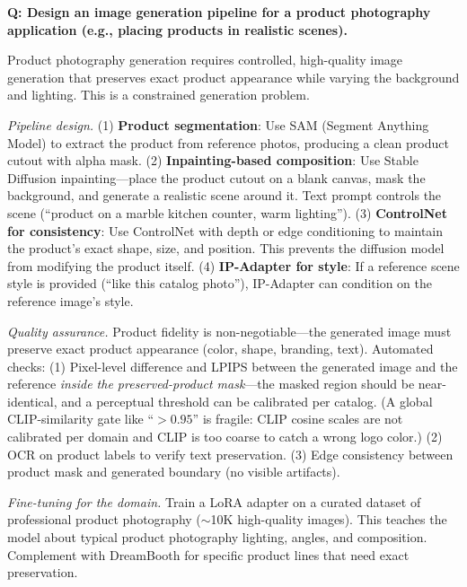 \begin{interviewq}
\textbf{Q: Design an image generation pipeline for a product photography application (e.g., placing products in realistic scenes).}

 \quad {} \quad \badgefreq{\freqmed}

\stronganswer Product photography generation requires controlled, high-quality image generation that preserves exact product appearance while varying the background and lighting. This is a constrained generation problem.

\textit{Pipeline design.} (1) \textbf{Product segmentation}: Use SAM (Segment Anything Model) to extract the product from reference photos, producing a clean product cutout with alpha mask. (2) \textbf{Inpainting-based composition}: Use Stable Diffusion inpainting---place the product cutout on a blank canvas, mask the background, and generate a realistic scene around it. Text prompt controls the scene (``product on a marble kitchen counter, warm lighting''). (3) \textbf{ControlNet for consistency}: Use ControlNet with depth or edge conditioning to maintain the product's exact shape, size, and position. This prevents the diffusion model from modifying the product itself. (4) \textbf{IP-Adapter for style}: If a reference scene style is provided (``like this catalog photo''), IP-Adapter can condition on the reference image's style.

\textit{Quality assurance.} Product fidelity is non-negotiable---the generated image must preserve exact product appearance (color, shape, branding, text). Automated checks: (1) Pixel-level difference and LPIPS between the generated image and the reference \textit{inside the preserved-product mask}---the masked region should be near-identical, and a perceptual threshold can be calibrated per catalog. (A global CLIP-similarity gate like ``$>0.95$'' is fragile: CLIP cosine scales are not calibrated per domain and CLIP is too coarse to catch a wrong logo color.) (2) OCR on product labels to verify text preservation. (3) Edge consistency between product mask and generated boundary (no visible artifacts).

\textit{Fine-tuning for the domain.} Train a LoRA adapter on a curated dataset of professional product photography ($\sim$10K high-quality images). This teaches the model about typical product photography lighting, angles, and composition. Complement with DreamBooth for specific product lines that need exact preservation.


\end{interviewq}
